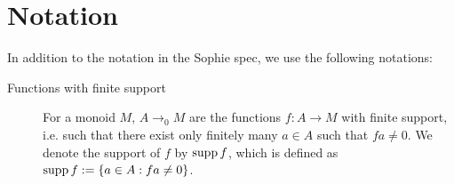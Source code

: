 \section{Notation}

In addition to the notation in the Sophie spec, we use the following notations:

\begin{description}
\item[Functions with finite support] For a monoid $M$, $A \to_0 M$
  are the functions $f : A \to M$ with finite support, i.e. such that
  there exist only finitely many $a \in A$ such that $f a \neq 0$. We
  denote the support of $f$ by $\operatorname{supp} f$, which is defined as
  $\operatorname{supp} f := \{ a \in A : f a \neq 0 \}$.
\end{description}
